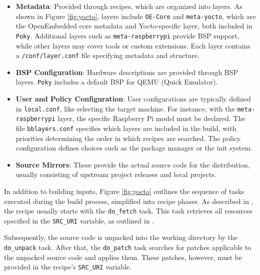 \begin{itemize}
    \item \textbf{Metadata}: Provided through recipes, which are organized into layers.  
          As shown in Figure \ref{fig:yocto}, layers include \texttt{OE-Core} and \texttt{meta-yocto}, which are the OpenEmbedded core metadata and Yocto-specific layer, both included in \texttt{Poky}.  
          Additional layers such as \texttt{meta-raspberrypi} provide \ac{BSP} support, while other layers may cover tools or custom extensions.  
          Each layer contains a \texttt{/conf/layer.conf} file specifying metadata and structure.  

    \item \textbf{\ac{BSP} Configuration}: Hardware descriptions are provided through \ac{BSP} layers.  
          \texttt{Poky} includes a default \ac{BSP} for QEMU (Quick Emulator).  

    \item \textbf{User and Policy Configuration}: User configurations are typically defined in \texttt{local.conf}, like selecting the target machine.  
          For instance, with the \texttt{meta-raspberrypi} layer, the specific Raspberry Pi model must be declared.  
          The file \texttt{bblayers.conf} specifies which layers are included in the build, with priorities determining the order in which recipes are searched.  
          The policy configuration defines choices such as the package manager or the init system.  

    \item \textbf{Source Mirrors}: These provide the actual source code for the distribution, usually consisting of upstream project releases and local projects.  
\end{itemize}

In addition to building inputs, Figure \ref{fig:yocto} outlines the sequence of tasks executed during the build process, simplified into recipe phases.  
As described in \cite{yocto_style_guide}, the recipe usually starts with the \texttt{do\_fetch} task.  
This task retrieves all resources specified in the \texttt{SRC\_URI} variable, as outlined in \cite{yocto_Tasks}.  

Subsequently, the source code is unpacked into the working directory by the \texttt{do\_unpack} task.  
After that, the \texttt{do\_patch} task searches for patches applicable to the unpacked source code and applies them.  
These patches, however, must be provided in the recipe's \texttt{SRC\_URI} variable.  

